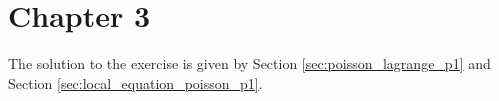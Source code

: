 
\section{Chapter 3}

\begin{tmasltn}{3.1}
The solution to the exercise is given by Section \ref{sec:poisson_lagrange_p1} and Section \ref{sec:local_equation_poisson_p1}.
\end{tmasltn}

